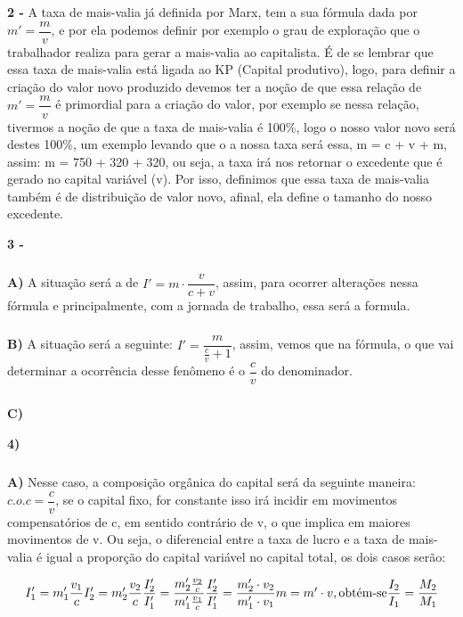 \documentclass[a4paper, 12pt]{article} %
\begin{document}
\par \textbf{2 -} A taxa de mais-valia já definida por Marx, tem a sua fórmula dada por $m' = \dfrac{m}{v}$, e por ela podemos definir por exemplo o grau de exploração que o trabalhador realiza para gerar a mais-valia ao capitalista. É de se lembrar que essa taxa de mais-valia está ligada ao KP (Capital produtivo), logo, para definir a criação do valor novo produzido devemos ter a noção de que essa relação de $m' = \dfrac{m}{v}$ é primordial para a criação do valor, por exemplo se nessa relação, tivermos a noção de que a taxa de mais-valia é 100\%, logo o nosso valor novo será destes 100\%, um exemplo levando que o a nossa taxa será essa, m = c + v + m, assim: m = 750 + 320 + 320, ou seja, a taxa irá nos retornar o excedente que é gerado no capital variável (v). Por isso, definimos que essa taxa de mais-valia também é de distribuição de valor novo, afinal, ela define o tamanho do nosso excedente.

\vspace{0.5cm}

\par \textbf{3 -}

\subparagraph{} \textbf{A)} A situação será a de $I' = m \cdot \dfrac{v}{c + v}$, assim, para ocorrer alterações nessa fórmula e principalmente, com a jornada de trabalho, essa será a formula.

\subparagraph{} \textbf{B)} A situação será a seguinte: $I' = \dfrac{m}{\frac{c}{v} + 1}$, assim, vemos que na fórmula, o que vai determinar a ocorrência desse fenômeno é o $\dfrac{c}{v}$ do denominador.

\subparagraph{} \textbf{C)} 

\vspace{0.5cm}

\par \textbf{4)} 

\subparagraph{} \textbf{A)} Nesse caso, a composição orgânica do capital será da seguinte maneira: $c.o.c = \dfrac{c}{v}$, se o capital fixo, for constante isso irá incidir em movimentos compensatórios de c, em sentido contrário de v, o que implica em maiores movimentos de v. Ou seja, o diferencial entre a taxa de lucro e a taxa de mais-valia é igual a proporção do capital variável no capital total, os dois casos serão:

\begin{equation}
I'_{1} = m'_{1}\dfrac{v_{1}}{c}
$$\\$$
I'_{2} = m'_{2}\dfrac{v_{2}}{c}
$$\\$$
\dfrac{I'_{2}}{I'_{1}} = \dfrac{m'_{2}\frac{v_{2}}{c}}{m'_{1}\frac{v_{1}}{c}}
$$\\$$
\dfrac{I'_{2}}{I'_{1}} = \dfrac{m'_{2}\cdot v_{2}}{m'_{1} \cdot v_{1}}
$$\\$$
m = m' \cdot v, \text{obtém-se} \dfrac{I_{2}}{I_{1}} = \dfrac{M_{2}}{M_{1}}
\end{equation} 
\end{document}
